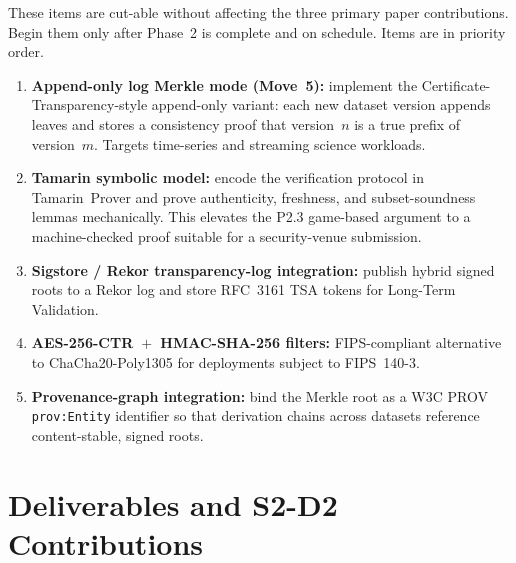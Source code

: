 \documentclass[11pt]{article}
\begin{document}
These items are cut-able without affecting the three primary paper
contributions. Begin them only after Phase~2 is complete and on schedule.
Items are in priority order.

\begin{enumerate}[nosep]
  \item \textbf{Append-only log Merkle mode (Move~5):} implement the
    Certificate-Transparency-style append-only variant: each new dataset
    version appends leaves and
    stores a consistency proof that version~$n$ is a true prefix of
    version~$m$. Targets time-series and streaming science workloads.
  \item \textbf{Tamarin symbolic model:} encode the verification
    protocol in Tamarin~Prover and prove authenticity, freshness, and
    subset-soundness lemmas mechanically. This elevates the P2.3
    game-based argument to a machine-checked proof suitable for a
    security-venue submission.
  \item \textbf{Sigstore / Rekor transparency-log integration:} publish
    hybrid signed roots to a Rekor log and store RFC~3161 TSA tokens for
    Long-Term Validation.
  \item \textbf{AES-256-CTR~$+$~HMAC-SHA-256 filters:} FIPS-compliant
    alternative to ChaCha20-Poly1305 for deployments subject to FIPS~140-3.
  \item \textbf{Provenance-graph integration:} bind the Merkle root as a
    W3C PROV~\cite{w3cprov} \texttt{prov:Entity} identifier so that
    derivation chains across datasets reference content-stable, signed
    roots.
\end{enumerate}


\section{Deliverables and S2-D2 Contributions}
\label{sec:deliverables}
\end{document}
